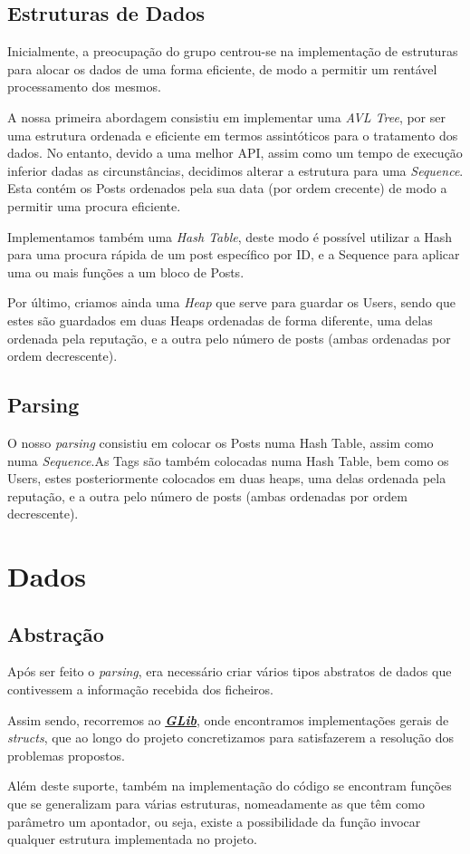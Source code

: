 \documentclass[a4paper]{report}
\begin{document}
	\section{Estruturas de Dados}
		\tab Inicialmente, a preocupação do grupo centrou-se na implementação de estruturas para alocar os dados de uma forma eficiente, de modo a permitir um rentável processamento dos mesmos.\par
		A nossa primeira abordagem consistiu em implementar uma \textit{AVL Tree}, por ser uma estrutura ordenada e eficiente em termos assintóticos para o tratamento dos dados. No entanto, devido a uma melhor API, assim como um tempo de execução inferior dadas as circunstâncias, decidimos alterar a estrutura para uma \textit{Sequence}. Esta contém os Posts ordenados pela sua data (por ordem crecente) de modo a permitir uma procura eficiente. \par
		Implementamos também uma \textit{Hash Table}, deste modo é possível utilizar a Hash para uma procura rápida de um post específico por ID, e a Sequence para aplicar uma ou mais funções a um bloco de Posts.\par
		Por último, criamos ainda uma \textit{Heap} que serve para guardar os Users, sendo que estes são guardados em duas Heaps ordenadas de forma diferente,  uma delas ordenada pela reputação, e a outra pelo número de posts (ambas ordenadas por ordem decrescente).

	\section{Parsing}
		\tab O nosso \textit{parsing} consistiu em colocar os Posts numa Hash Table, assim como numa \textit{Sequence}.As Tags são também colocadas numa Hash Table, bem como os Users, estes posteriormente colocados em duas heaps, uma delas ordenada pela reputação, e a outra pelo número de posts (ambas ordenadas por ordem decrescente).\par

\chapter{Dados}
	\section{Abstração}
		\tab Após ser feito o \textit{parsing}, era necessário criar vários tipos abstratos de dados que contivessem a informação recebida dos ficheiros. \par
	Assim sendo, recorremos ao \href{https://developer.gnome.org/glib/}{\textit{\textbf{GLib}}}, onde encontramos implementações gerais de \textit{structs}, que ao longo do projeto concretizamos para satisfazerem a resolução dos problemas propostos. \par
	Além deste suporte, também na implementação do código se encontram funções que se generalizam para várias estruturas, nomeadamente as que têm como parâmetro um apontador, ou seja, existe a possibilidade da função invocar qualquer estrutura implementada no projeto.
\end{document}

